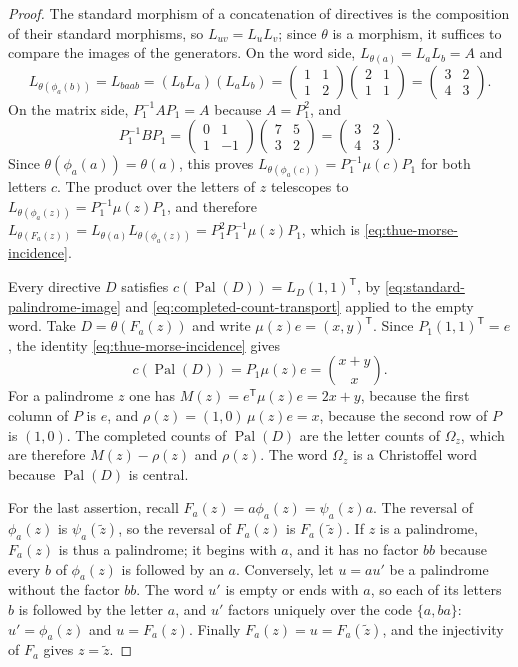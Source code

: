 \begin{proof}
The standard morphism of a concatenation of directives is the composition of their
standard morphisms, so $L_{uv}=L_uL_v$; since $\theta$ is a morphism, it suffices to compare
the images of the generators. On the word side, $L_{\theta(a)}=L_aL_b=A$ and
$$
 L_{\theta(\phi_a(b))}=L_{baab}=(L_bL_a)(L_aL_b)
 =\begin{pmatrix}1&1\\1&2\end{pmatrix}\begin{pmatrix}2&1\\1&1\end{pmatrix}
 =\begin{pmatrix}3&2\\4&3\end{pmatrix}.
$$
On the matrix side, $P_1^{-1}AP_1=A$ because $A=P_1^2$, and
$$
 P_1^{-1}BP_1=\begin{pmatrix}0&1\\1&-1\end{pmatrix}\begin{pmatrix}7&5\\3&2\end{pmatrix}
 =\begin{pmatrix}3&2\\4&3\end{pmatrix}.
$$
Since $\theta(\phi_a(a))=\theta(a)$, this proves $L_{\theta(\phi_a(c))}=P_1^{-1}\mu(c)P_1$ for
both letters $c$. The product over the letters of $z$ telescopes to
$L_{\theta(\phi_a(z))}=P_1^{-1}\mu(z)P_1$, and therefore
$L_{\theta(F_a(z))}=L_{\theta(a)}L_{\theta(\phi_a(z))}=P_1^2P_1^{-1}\mu(z)P_1$, which is
\eqref{eq:thue-morse-incidence}.

Every directive $D$ satisfies $c(\operatorname{Pal}(D))=L_D(1,1)^{\mathsf T}$, by
\eqref{eq:standard-palindrome-image} and \eqref{eq:completed-count-transport} applied to the
empty word. Take $D=\theta(F_a(z))$ and write $\mu(z)e=(x,y)^{\mathsf T}$. Since
$P_1(1,1)^{\mathsf T}=e$, the identity \eqref{eq:thue-morse-incidence} gives
$$
 c(\operatorname{Pal}(D))=P_1\mu(z)e=\binom{x+y}{x}.
$$
For a palindrome $z$ one has $M(z)=e^{\mathsf T}\mu(z)e=2x+y$, because the first column of
$P$ is $e$, and $\rho(z)=(1,0)\,\mu(z)e=x$, because the second row of $P$ is $(1,0)$. The
completed counts of $\operatorname{Pal}(D)$ are the letter counts of $\Omega_z$, which are
therefore $M(z)-\rho(z)$ and $\rho(z)$. The word $\Omega_z$ is a Christoffel word because
$\operatorname{Pal}(D)$ is central.

For the last assertion, recall $F_a(z)=a\phi_a(z)=\psi_a(z)a$. The reversal of
$\phi_a(z)$ is $\psi_a(\widetilde z)$, so the reversal of $F_a(z)$ is $F_a(\widetilde z)$. If
$z$ is a palindrome, $F_a(z)$ is thus a palindrome; it begins with $a$, and it has no factor
$bb$ because every $b$ of $\phi_a(z)$ is followed by an $a$. Conversely, let $u=au'$ be a
palindrome without the factor $bb$. The word $u'$ is empty or ends with $a$, so each of its
letters $b$ is followed by the letter $a$, and $u'$ factors uniquely over the code
$\{a,ba\}$: $u'=\phi_a(z)$ and $u=F_a(z)$. Finally $F_a(z)=u=F_a(\widetilde z)$, and the
injectivity of $F_a$ gives $z=\widetilde z$.
\end{proof}

